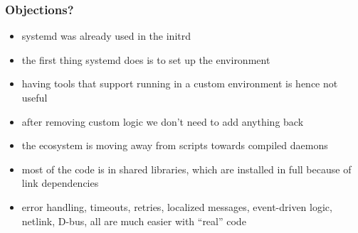\documentclass[]{beamer}
\newcommand\pp{}
\begin{document}
\begin{frame}
\end{frame}

\begin{frame}
  \frametitle{Objections?}


  \begin{itemize}
    \pp
    \item
      systemd was already used in the initrd
    \pp
    \item
      the first thing systemd does is to set up the environment
    \pp
    \item
      having tools that support running in a custom environment is hence not useful
    \pp
    \item
      after removing custom logic we don't need to add anything back
    \pp
    \item
      the ecosystem is moving away from scripts towards compiled daemons
    \pp
    \item
      most of the code is in shared libraries, which are installed in full because of link dependencies
    \pp
    \item
      error handling, timeouts, retries, localized messages, event-driven logic, netlink,
      D-bus, all are much easier with ``real'' code
  \end{itemize}
\end{frame}
\end{document}
